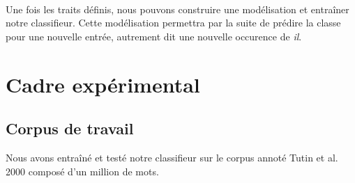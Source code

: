 \documentclass[a4paper,12pt]{article}
\begin{document}
% 
% 

\paragraph{}
Une fois les traits définis, nous pouvons construire une modélisation et entraîner notre classifieur. Cette modélisation permettra par la suite de prédire la classe pour une nouvelle entrée, autrement dit une nouvelle occurence de \og{}\textit{il}\fg{}.



\section{Cadre expérimental}

\subsection{Corpus de travail}

Nous avons entraîné et testé notre classifieur sur le corpus annoté Tutin et al. 2000 composé d'un million de mots.
\end{document}

